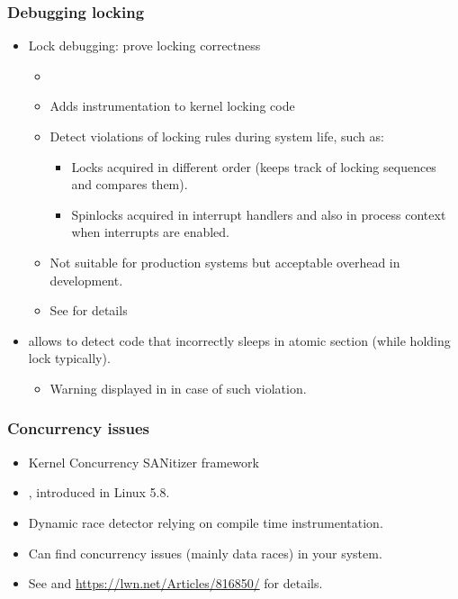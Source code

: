\begin{frame}
  \frametitle{Debugging locking}
  \begin{itemize}
  \item Lock debugging: prove locking correctness
    \begin{itemize}
    \item {}
    \item Adds instrumentation to kernel locking code
    \item Detect violations of locking rules during system life, such as:
      \begin{itemize}
      \item Locks acquired in different order (keeps track of locking
        sequences and compares them).
      \item Spinlocks acquired in interrupt handlers and also in
        process context when interrupts are enabled.
      \end{itemize}
    \item Not suitable for production systems but acceptable overhead
      in development.
    \item See  for details
    \end{itemize}
    \item {} allows to detect code that
      incorrectly sleeps in atomic section (while holding lock typically).
      \begin{itemize}
        \item Warning displayed in  in case of such violation.
        \end{itemize}
  \end{itemize}
\end{frame}

\begin{frame}
  \frametitle{Concurrency issues}
  \begin{itemize}
    \item Kernel Concurrency SANitizer framework
    \item {}, introduced in Linux 5.8.
    \item Dynamic race detector relying on compile time instrumentation. 
    \item Can find concurrency issues (mainly data races) in your system.
    \item See  and
        \url{https://lwn.net/Articles/816850/} for details.
  \end{itemize}
\end{frame}
